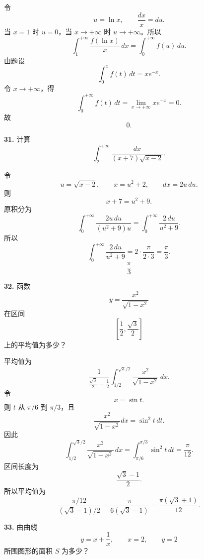 \begin{solutionblock}
令
\[
u=\ln x,\qquad \frac{dx}{x}=du.
\]
当 \(x=1\) 时 \(u=0\)，当 \(x\to+\infty\) 时 \(u\to+\infty\)。所以
\[
\int_1^{+\infty}\frac{f(\ln x)}{x}\,dx
=\int_0^{+\infty}f(u)\,du.
\]
由题设
\[
\int_0^x f(t)\,dt=xe^{-x}.
\]
令 \(x\to+\infty\)，得
\[
\int_0^{+\infty}f(t)\,dt
=\lim_{x\to+\infty}xe^{-x}=0.
\]
故
\[
\boxed{0}.
\]
\end{solutionblock}

\begin{problemblock}
\textbf{31.} 计算
\[
\int_2^{+\infty}\frac{dx}{(x+7)\sqrt{x-2}}.
\]
\end{problemblock}

\begin{solutionblock}
令
\[
u=\sqrt{x-2},\qquad x=u^2+2,\qquad dx=2u\,du.
\]
则
\[
x+7=u^2+9.
\]
原积分为
\[
\int_0^{+\infty}\frac{2u\,du}{(u^2+9)u}
=\int_0^{+\infty}\frac{2\,du}{u^2+9}.
\]
所以
\[
\int_0^{+\infty}\frac{2\,du}{u^2+9}
=2\cdot \frac{\pi}{2\cdot3}
=\frac{\pi}{3}.
\]
\[
\boxed{\frac{\pi}{3}}
\]
\end{solutionblock}

\begin{problemblock}
\textbf{32.} 函数
\[
y=\frac{x^2}{\sqrt{1-x^2}}
\]
在区间
\[
\left[\frac12,\frac{\sqrt3}{2}\right]
\]
上的平均值为多少？
\end{problemblock}

\begin{solutionblock}
平均值为
\[
\frac{1}{\frac{\sqrt3}{2}-\frac12}
\int_{1/2}^{\sqrt3/2}\frac{x^2}{\sqrt{1-x^2}}\,dx.
\]
令
\[
x=\sin t.
\]
则 \(t\) 从 \(\pi/6\) 到 \(\pi/3\)，且
\[
\frac{x^2}{\sqrt{1-x^2}}dx=\sin^2t\,dt.
\]
因此
\[
\int_{1/2}^{\sqrt3/2}\frac{x^2}{\sqrt{1-x^2}}\,dx
=\int_{\pi/6}^{\pi/3}\sin^2t\,dt
=\frac{\pi}{12}.
\]
区间长度为
\[
\frac{\sqrt3-1}{2}.
\]
所以平均值为
\[
\frac{\pi/12}{(\sqrt3-1)/2}
=\frac{\pi}{6(\sqrt3-1)}
=\boxed{\frac{\pi(\sqrt3+1)}{12}}.
\]
\end{solutionblock}

\begin{problemblock}
\textbf{33.} 由曲线
\[
y=x+\frac1x,\qquad x=2,\qquad y=2
\]
所围图形的面积 \(S\) 为多少？
\end{problemblock}

